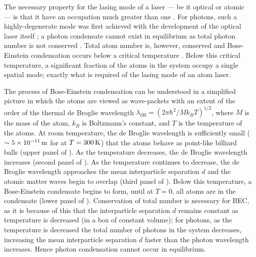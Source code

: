 The necessary property for the lasing mode of a laser --- be it optical or atomic --- is that it have an occupation much greater than one \citep{Wiseman:1997ba}.  For photons, such a highly-degenerate mode was first achieved with the development of the optical laser itself \citep{Maiman:1960,Javan:1961}; a photon condensate cannot exist in equilibrium as total photon number is not conserved \citep{Muller:1986,Ketterle:1999fk}.  Total atom number is, however, conserved and Bose-Einstein condensation occurs below a critical temperature \citep{PethickSmith}.  Below this critical temperature, a significant fraction of the atoms in the system occupy a single spatial mode; exactly what is required of the lasing mode of an atom laser.

The process of Bose-Einstein condensation can be understood in a simplified picture in which the atoms are viewed as wave-packets with an extent of the order of the thermal de Broglie wavelength $\lambda_\text{dB} = (2 \pi \hbar^2 / M k_B T)^{1/2}$, where $M$ is the mass of the atom, $k_B$ is Boltzmann's constant, and $T$ is the temperature of the atoms.  At room temperature, the de Broglie wavelength is sufficiently small ($\sim 5\times\unit[10^{-11}]{m}$ for  at $T=\unit[300]{K}$) that the atoms behave as point-like billiard balls (upper panel of ).  As the temperature decreases, the de Broglie wavelength increases (second panel of ).  As the temperature continues to decrease, the de Broglie wavelength approaches the mean interparticle separation $d$ and the atomic matter waves begin to overlap (third panel of ).  Below this temperature, a Bose-Einstein condensate begins to form, until at $T=0$, all atoms are in the condensate (lower panel of ).  Conservation of total number is necessary for BEC, as it is because of this that the interparticle separation $d$ remains constant as temperature is decreased (in a box of constant volume); for photons, as the temperature is decreased the total number of photons in the system decreases, increasing the mean interparticle separation $d$ faster than the photon wavelength increases.  Hence photon condensation cannot occur in equilibrium.

